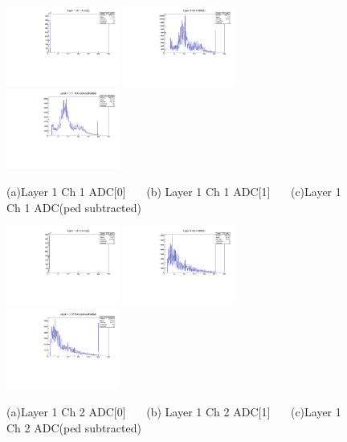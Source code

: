 \documentclass[a4paper,11pt]{article}
\theoremstyle{mytheor}
\begin{document}
\begin{figure}[H] 
\vspace*{-0.3cm} 
\includegraphics[width=0.33\textwidth,scale=0.5,trim=0 0 0 0,clip]{plotsdir/file0_test-Layer1_Ch1_adc0-1.pdf} 
\includegraphics[width=0.33\textwidth,scale=0.5,trim=0 0 0 0,clip]{plotsdir/file0_test-Layer1_Ch1_adc1-1.pdf} 
\includegraphics[width=0.33\textwidth,scale=0.5,trim=0 0 0 0,clip]{plotsdir/file0_test-Layer1_Ch1_adcPedsub-1.pdf} 
\caption{(a)Layer 1 Ch 1 ADC[0] ~~~(b) Layer 1 Ch 1 ADC[1] ~~~(c)Layer 1 Ch 1 ADC(ped subtracted) } 
\end{figure} 
\begin{figure}[H] 
\vspace*{-0.3cm} 
\includegraphics[width=0.33\textwidth,scale=0.5,trim=0 0 0 0,clip]{plotsdir/file0_test-Layer1_Ch2_adc0-1.pdf} 
\includegraphics[width=0.33\textwidth,scale=0.5,trim=0 0 0 0,clip]{plotsdir/file0_test-Layer1_Ch2_adc1-1.pdf} 
\includegraphics[width=0.33\textwidth,scale=0.5,trim=0 0 0 0,clip]{plotsdir/file0_test-Layer1_Ch2_adcPedsub-1.pdf} 
\caption{(a)Layer 1 Ch 2 ADC[0] ~~~(b) Layer 1 Ch 2 ADC[1] ~~~(c)Layer 1 Ch 2 ADC(ped subtracted) } 
\end{figure} 
\end{document}

